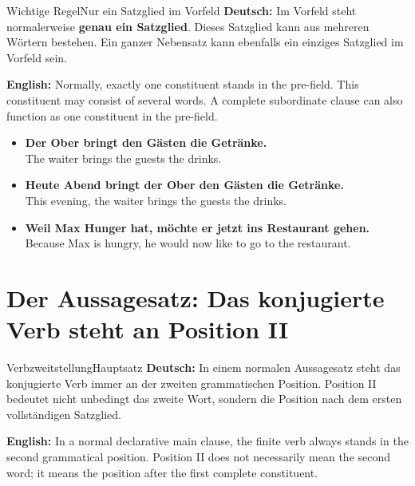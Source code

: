 \documentclass[a4paper,11pt]{article}
\newcommand{\GermanText}[1]{\textbf{Deutsch: }#1\par}
\newcommand{\EnglishText}[1]{{\small\color{SoftGray}\textbf{English: }#1\par}}
\newcommand{\ExampleItem}[2]{\item \textbf{#1}\\{\small\color{SoftGray}#2}}
\begin{document}
        \begin{grammarentry}{Wichtige Regel}{Nur ein Satzglied im Vorfeld}
            \GermanText{Im Vorfeld steht normalerweise \textbf{genau ein Satzglied}. Dieses Satzglied kann aus mehreren Wörtern bestehen. Ein ganzer Nebensatz kann ebenfalls ein einziges Satzglied im Vorfeld sein.}
            \EnglishText{Normally, exactly one constituent stands in the pre-field. This constituent may consist of several words. A complete subordinate clause can also function as one constituent in the pre-field.}
        \end{grammarentry}
        
        \begin{exbox}
            \begin{itemize}
                \ExampleItem{Der Ober bringt den Gästen die Getränke.}{The waiter brings the guests the drinks.}
                \ExampleItem{Heute Abend bringt der Ober den Gästen die Getränke.}{This evening, the waiter brings the guests the drinks.}
                \ExampleItem{Weil Max Hunger hat, möchte er jetzt ins Restaurant gehen.}{Because Max is hungry, he would now like to go to the restaurant.}
            \end{itemize}
        \end{exbox}
    
    
    \section{Der Aussagesatz: Das konjugierte Verb steht an Position II}
        
        \begin{grammarentry}{Verbzweitstellung}{Hauptsatz}
            \GermanText{In einem normalen Aussagesatz steht das konjugierte Verb immer an der zweiten grammatischen Position. Position II bedeutet nicht unbedingt das zweite Wort, sondern die Position nach dem ersten vollständigen Satzglied.}
            \EnglishText{In a normal declarative main clause, the finite verb always stands in the second grammatical position. Position II does not necessarily mean the second word; it means the position after the first complete constituent.}
        \end{grammarentry}
        
\end{document}
